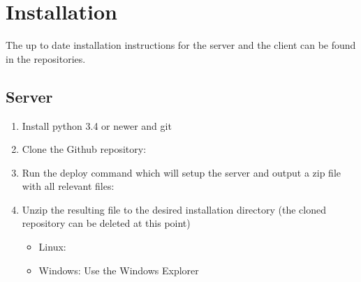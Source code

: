 \documentclass[accentcolor=tud1a, paper=a4, colorback]{tudreport}
\begin{document}
	\chapter{Installation}
	The up to date installation instructions for the server and the client can be found in the repositories.
	\section{Server}

	\begin{enumerate}
		\item Install python 3.4 or newer and git
		\item Clone the Github repository:\\ 
		\item Run the deploy command which will setup the server and output a zip file with all relevant files:\\
		\item Unzip the resulting file to the desired installation directory (the cloned repository can be deleted at this point) 
		\begin{itemize}
			\item Linux:\\ 
			\item Windows: Use the Windows Explorer
		\end{itemize}
	\end{enumerate}
\end{document}
